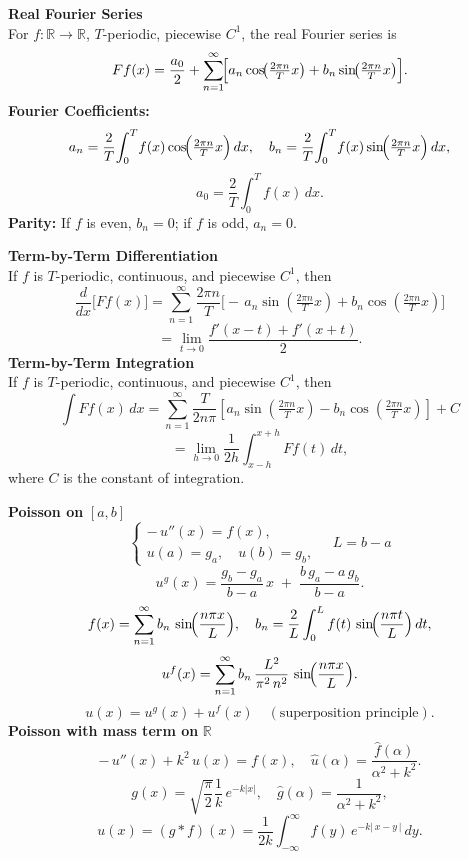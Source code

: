 \documentclass[8pt]{article}
\begin{document}
\begin{multicols}{2}
	\noindent \textbf{Real Fourier Series}\\
	For $f:\mathbb{R}\to\mathbb{R}$, $T$-periodic, piecewise $C^1$, the real Fourier series is \vspace{-3px}
	\[ \vspace{-8px}
		Ff(x)= \frac{a_{0}}{2}
		+ \sum_{n=1}^{\infty}\!\Bigl[a_{n}\cos\!\bigl(\tfrac{2\pi n}{T}x\bigr)
			+ b_{n}\sin\!\bigl(\tfrac{2\pi n}{T}x\bigr)\Bigr].
	\]
	\noindent \textbf{Fourier Coefficients:} \vspace{-3px}
	\[
		a_{n} = \frac{2}{T}\!\int_{0}^{T}\!f(x)
		\cos\!\Bigl(\tfrac{2\pi n}{T}x\Bigr)\,dx,\quad
		b_{n} = \frac{2}{T}\!\int_{0}^{T}\!f(x)
		\sin\!\Bigl(\tfrac{2\pi n}{T}x\Bigr)\,dx,
	\] \vspace{-8px}
	\[
		a_{0} = \frac{2}{T}\int_{0}^{T} f(x)\,dx.
	\]
	\noindent \textbf{Parity:} If $f$ is even, $b_{n}=0$; if $f$ is odd, $a_{n}=0$.\\

	\small

	\noindent \textbf{Term-by-Term Differentiation}\\
	If $f$ is $T$-periodic, continuous, and piecewise $C^1$, then
	\[
		\frac{d}{dx}\bigl[Ff(x)\bigr]
		= \sum_{n=1}^\infty \frac{2\pi n}{T}\bigl[-\,a_n\sin(\tfrac{2\pi n}{T}x)
			+b_n\cos(\tfrac{2\pi n}{T}x)\bigr]
	\]
	\[
		= \lim_{t \to 0} \frac{f'(x - t) + f'(x + t)}{2}.
	\]
	\noindent \textbf{Term-by-Term Integration}\\
	If $f$ is $T$-periodic, continuous, and piecewise $C^1$, then
	\[
		\int Ff(x)\,dx
		= \sum_{n=1}^\infty \frac{T}{2 n \pi} \left[ a_n \sin\left(\tfrac{2\pi n}{T}x\right)
			- b_n \cos\left(\tfrac{2\pi n}{T}x\right) \right] + C
	\]
	\[
		= \lim_{h \to 0} \frac{1}{2h} \int_{x - h}^{x + h} Ff(t)\,dt,
	\]
	where $C$ is the constant of integration.

	\noindent \textbf{Poisson on }$[a,b]$
	\[
		\begin{cases}
			-\,u''(x)=f(x), \\[2pt]
			u(a)=g_a,\quad u(b)=g_b,
		\end{cases}
		\quad
		L = b - a
	\]
	\[
		u^g(x)=\frac{g_b-g_a}{b-a}\,x \;+\;\frac{b\,g_a - a\,g_b}{b-a}.
	\]
	\[
		f(x)=\sum_{n=1}^{\infty} b_n \,\sin\!\Bigl(\frac{n\pi x}{L}\Bigr),
		\quad
		b_n=\frac{2}{L}\int_{0}^{L}f(t)\,\sin\!\Bigl(\frac{n\pi t}{L}\Bigr)\,dt,
	\]
	\[
		u^f(x)=\sum_{n=1}^{\infty} b_n \,\frac{L^2}{\pi^2\,n^2}
		\,\sin\!\Bigl(\frac{n\pi x}{L}\Bigr).
	\]
	\[
		u(x)=u^g(x)+u^f(x) \quad (\text{superposition principle}).
	\]
	\noindent \textbf{Poisson with mass term on }$\mathbb{R}$ \vspace{-5px}
	\[
		-\,u''(x)+k^2\,u(x)=f(x),
		\quad
		\widehat{u}(\alpha)=\frac{\widehat{f}(\alpha)}{\alpha^2 + k^2}.
	\]
	\vspace{-5px}
	\[
		g(x)=\sqrt{\frac{\pi}{2}} \frac{1}{k}\,e^{-k|x|},
		\quad
		\widehat{g}(\alpha)=\frac{1}{\alpha^2 + k^2},
	\]
	\vspace{-5px}\[
		u(x)=(g*f)(x)
		=\frac{1}{2k}\!\int_{-\infty}^{\infty} f(y)\,e^{-k|\,x-y\,|}\,dy.
	\]


\end{multicols}
\end{document}
